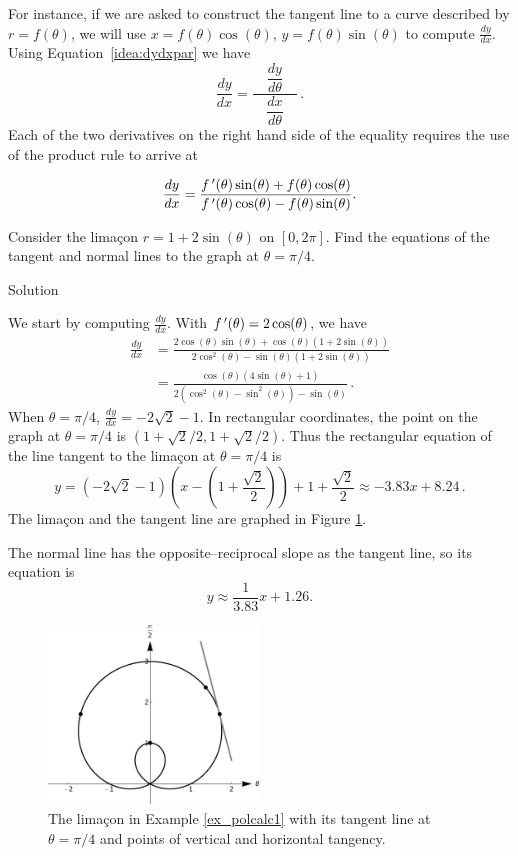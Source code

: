 For instance, if we are asked to construct the tangent line to a curve described by $r=f(\theta)$, we will use $x=f(\theta)\cos(\theta)$, $y=f(\theta)\sin(\theta)$ to compute $\frac{dy}{dx}$. Using Equation~\eqref{idea:dydxpar} we have 
$$
\frac{dy}{dx} = \frac{\quad\dfrac{dy}{d\theta}\quad}{\dfrac{dx}{d\theta}}\,.
$$
Each of the two derivatives on the right hand side of the equality requires the use of the product rule to arrive at

\begin{equation}
\frac{dy}{dx} = \frac{f\,'(\theta)\sin(\theta)+f(\theta)\cos(\theta)}{f\,'(\theta)\cos(\theta)-f(\theta)\sin(\theta)}.
\label{idea:dydxpol}
\end{equation}

\begin{example}\label{ex_polcalc1}
Consider the lima\c con $r=1+2\sin(\theta)$ on $[0,2\pi]$. Find the equations of the tangent and normal lines to the graph at $\theta=\pi/4$.

\ifcalculus\pagebreak\fi
{}Solution 

We start by computing $\frac{dy}{dx}$. With $f\,'(\theta) = 2\cos(\theta)$, we have
	\begin{align*}
	\frac{dy}{dx} &= \frac{2\cos(\theta)\sin(\theta) + \cos(\theta)(1+2\sin(\theta))}{2\cos^2(\theta)-\sin(\theta)(1+2\sin(\theta))}\\[0.2cm]
	&= \frac{\cos(\theta)(4\sin(\theta)+1)}{2(\cos^2(\theta)-\sin^2(\theta))-\sin(\theta)}\,.
	\end{align*}
	When $\theta=\pi/4$, $\frac{dy}{dx}=-2\sqrt{2}-1$. In rectangular coordinates, the point on the graph at $\theta=\pi/4$ is $(1+\sqrt{2}/2,1+\sqrt{2}/2)$. Thus the rectangular equation of the line tangent to the lima\c con at $\theta=\pi/4$ is 
	$$y=(-2\sqrt{2}-1)\left(x-\left(1+\dfrac{\sqrt{2}}{2}\right)\right)+1+\dfrac{\sqrt{2}}{2} \approx  -3.83 x+8.24\,.$$ The lima\c con and the tangent line are graphed in Figure \ref{fig_parametric_20}. 
	
	The normal line has the opposite--reciprocal slope as the tangent line, so its equation is 
	$$y \approx \frac{1}{3.83}x+1.26.$$
	
			\begin{figure}[H]
	\begin{center}
			\includegraphics[width=0.5\textwidth]{fig_parametric_20}
	\caption{The lima\c con in Example \ref{ex_polcalc1} with its tangent line at $\theta=\pi/4$ and points of vertical and horizontal tangency.}
	\label{fig_parametric_20}
	\end{center}
\end{figure}



\end{example}
